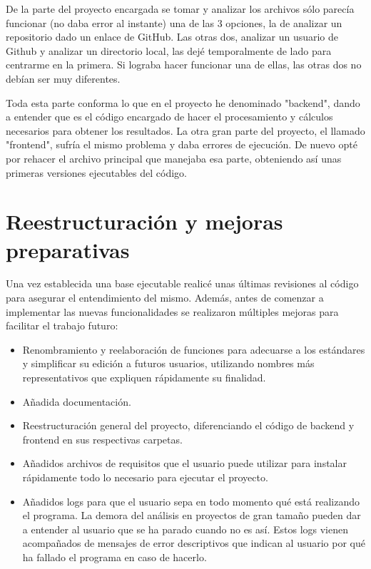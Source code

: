 \documentclass[a4paper, 12pt]{book}
\begin{document}
De la parte del proyecto encargada se tomar y analizar los archivos sólo parecía funcionar (no daba error al instante) una de las 3 opciones, la de analizar un repositorio dado un enlace de GitHub. Las otras dos, analizar un usuario de Github y analizar un directorio local, las dejé temporalmente de lado para centrarme en la primera. Si lograba hacer funcionar una de ellas, las otras dos no debían ser muy diferentes.

Toda esta parte conforma lo que en el proyecto he denominado "backend", dando a entender que es el código encargado de hacer el procesamiento y cálculos necesarios para obtener los resultados. La otra gran parte del proyecto, el llamado "frontend", sufría el mismo problema y daba errores de ejecución. De nuevo opté por rehacer el archivo principal que manejaba esa parte, obteniendo así unas primeras versiones ejecutables del código.

\section{Reestructuración y mejoras preparativas}

Una vez establecida una base ejecutable realicé unas últimas revisiones al código para asegurar el entendimiento del mismo. Además, antes de comenzar a implementar las nuevas funcionalidades se realizaron múltiples mejoras para facilitar el trabajo futuro:

\begin{itemize}
    \item Renombramiento y reelaboración de funciones para adecuarse a los estándares y simplificar su edición a futuros usuarios, utilizando nombres más representativos que expliquen rápidamente su finalidad.
    \item Añadida documentación.
    \item Reestructuración general del proyecto, diferenciando el código de backend y frontend en sus respectivas carpetas.
    \item Añadidos archivos de requisitos que el usuario puede utilizar para instalar rápidamente todo lo necesario para ejecutar el proyecto.
    \item Añadidos logs para que el usuario sepa en todo momento qué está realizando el programa. La demora del análisis en proyectos de gran tamaño pueden dar a entender al usuario que se ha parado cuando no es así. Estos logs vienen acompañados de mensajes de error descriptivos que indican al usuario por qué ha fallado el programa en caso de hacerlo.
\end{itemize}
\end{document}
